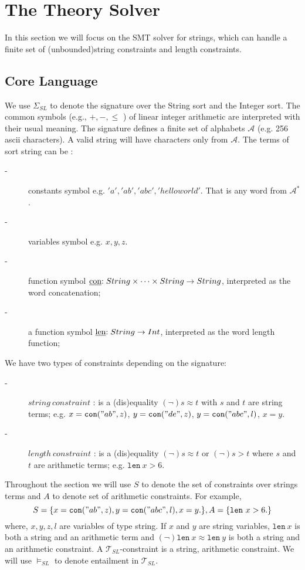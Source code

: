 \section{The Theory Solver}
\label{sec:the theory solver}
In this section we will focus on the SMT solver for strings, which can handle a finite set of (unbounded)string constraints and length constraints.

\subsection{Core Language}
\label{sec:Core language}
We use \( \Sigma_{SL}\) to denote the signature over the String sort and the Integer sort. 
The common symbols (e.g., \( + , - ,  \le \) ) of linear integer arithmetic are interpreted with their usual meaning. The signature defines a finite set of alphabets $\mathcal{A}$ (e.g. 256 ascii characters). A valid string will have characters only from  $\mathcal{A}$. The terms of sort string can be :
\begin{description}
	\item[-] constants symbol e.g. $'a', 'ab', 'abc','helloworld'$. That is any word from  $\mathcal{A}^*$. 
    \item[-] variables symbol e.g. $x, y, z$.
	\item[-] function symbol \($\underline{con}$ : String \times \cdots \times String \to String\), interpreted as the word concatenation;
	\item[-] a function symbol \($\underline{len}$ : String  \to Int \), interpreted as the word length function;    
\end{description}
We have two types of constraints depending on the signature:
\begin{description}
	\item[-] \( string \ constraint \) : is a (dis)equality  \( (\neg) s \approx t \) with \(s\) and \(t\) are string terms; e.g.
		     $x =  \texttt{con}("ab", z) $,
	         $y =  \texttt{con}("de", z) $,  
	         $y =  \texttt{con}("abc", l)$,  
	         $x =  y$.   
    \item[-] \( length \ constraint \) : is a (dis)equality  \( (\neg) s \approx t \) or \( (\neg) s > t \) where \(s\) and \(t\) are arithmetic terms; e.g. $\texttt{len}\ x > 6$.
\end{description}
Throughout the section we will use $S$ to denote the set of constraints over strings terms and $A$ to denote set of arithmetic constraints. For example, 
\[
S = \{      x =  \texttt{con}("ab", z) ,y =  \texttt{con}("abc", l),x =  y. \},
A = \{      \texttt{len}\ x > 6. \}
\]
where, $x,y,z,l$ are variables of type string. If \(x\) and \(y\) are string variables, \(\texttt{len} \ x\) is both a string and an arithmetic term and  \((\neg)\texttt{len} \ x \approx \texttt{len} \ y\) is both a string and an arithmetic constraint. A \(\mathcal{T}_{SL}\)-constraint is a string, arithmetic constraint. We will use \( \models_{SL}\) to denote entailment in \(\mathcal{T}_{SL}\).